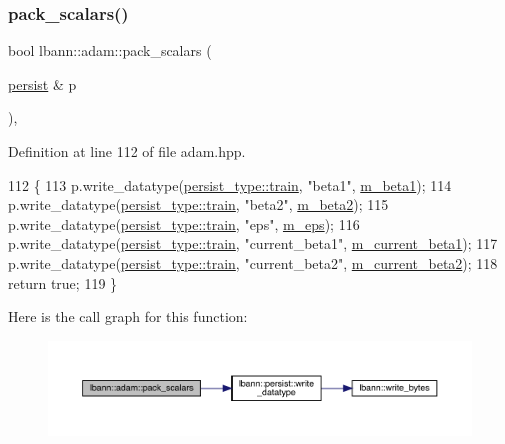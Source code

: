 \subsubsection{\texorpdfstring{pack\+\_\+scalars()}{pack\_scalars()}}
{\footnotesize\ttfamily bool lbann\+::adam\+::pack\+\_\+scalars (\begin{DoxyParamCaption}\item[{\hyperlink{classlbann_1_1persist}{persist} \&}]{p }\end{DoxyParamCaption})\hspace{0.3cm}{\ttfamily [inline]}, {\ttfamily [private]}}



Definition at line 112 of file adam.\+hpp.


\begin{DoxyCode}
112                                 \{
113     p.write\_datatype(\hyperlink{namespacelbann_adee41f31f15f3906cbdcce4a1417eb56a61b3a8faa9c1091806675c230a9abe64}{persist\_type::train}, \textcolor{stringliteral}{"beta1"}, \hyperlink{classlbann_1_1adam_a73af15a28066edbfad9ba6a900746a19}{m\_beta1});
114     p.write\_datatype(\hyperlink{namespacelbann_adee41f31f15f3906cbdcce4a1417eb56a61b3a8faa9c1091806675c230a9abe64}{persist\_type::train}, \textcolor{stringliteral}{"beta2"}, \hyperlink{classlbann_1_1adam_ab1f2a16b8eb7e265895ea9eef3fe87b2}{m\_beta2});
115     p.write\_datatype(\hyperlink{namespacelbann_adee41f31f15f3906cbdcce4a1417eb56a61b3a8faa9c1091806675c230a9abe64}{persist\_type::train}, \textcolor{stringliteral}{"eps"},   \hyperlink{classlbann_1_1adam_a751102f0fd866612f5685050a08020a9}{m\_eps});
116     p.write\_datatype(\hyperlink{namespacelbann_adee41f31f15f3906cbdcce4a1417eb56a61b3a8faa9c1091806675c230a9abe64}{persist\_type::train}, \textcolor{stringliteral}{"current\_beta1"}, 
      \hyperlink{classlbann_1_1adam_a53c3034e187da2720447bbb4f2b59a5d}{m\_current\_beta1});
117     p.write\_datatype(\hyperlink{namespacelbann_adee41f31f15f3906cbdcce4a1417eb56a61b3a8faa9c1091806675c230a9abe64}{persist\_type::train}, \textcolor{stringliteral}{"current\_beta2"}, 
      \hyperlink{classlbann_1_1adam_ad38376b684d69d4a15da1d11f8808ca7}{m\_current\_beta2});
118     \textcolor{keywordflow}{return} \textcolor{keyword}{true};
119   \}
\end{DoxyCode}
Here is the call graph for this function\+:\nopagebreak
\begin{figure}[H]
\begin{center}
\leavevmode
\includegraphics[width=350pt]{classlbann_1_1adam_a43e941b596c5d1cc68b795b0399398c4_cgraph}
\end{center}
\end{figure}
